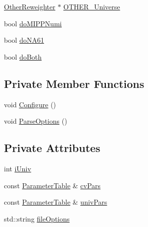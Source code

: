 \begin{DoxyCompactItemize}
\item 
\hyperlink{class_neutrino_flux_reweight_1_1_other_reweighter}{Other\-Reweighter} $\ast$ \hyperlink{class_neutrino_flux_reweight_1_1_reweight_driver_a2dc00c13f6d02ff7fb1fdce8f3a07413}{O\-T\-H\-E\-R\-\_\-\-Universe}
\item 
bool \hyperlink{class_neutrino_flux_reweight_1_1_reweight_driver_af4008e9db9a4dd5421e110e8281f5690}{do\-M\-I\-P\-P\-Numi}
\item 
bool \hyperlink{class_neutrino_flux_reweight_1_1_reweight_driver_a2bf534e3c1edd88075c4cf720390e2df}{do\-N\-A61}
\item 
bool \hyperlink{class_neutrino_flux_reweight_1_1_reweight_driver_ae950950ece1bdb68ce6bf20713f98209}{do\-Both}
\end{DoxyCompactItemize}
\subsection*{Private Member Functions}
\begin{DoxyCompactItemize}
\item 
void \hyperlink{class_neutrino_flux_reweight_1_1_reweight_driver_a7395fe76708db62b11ec9e867b48f30d}{Configure} ()
\item 
void \hyperlink{class_neutrino_flux_reweight_1_1_reweight_driver_adf5e4b16f98f623becd2907dde4ad12e}{Parse\-Options} ()
\end{DoxyCompactItemize}
\subsection*{Private Attributes}
\begin{DoxyCompactItemize}
\item 
int \hyperlink{class_neutrino_flux_reweight_1_1_reweight_driver_a916073e9a6658dd7cbc7c8819dd71c8a}{i\-Univ}
\item 
const \hyperlink{class_neutrino_flux_reweight_1_1_parameter_table}{Parameter\-Table} \& \hyperlink{class_neutrino_flux_reweight_1_1_reweight_driver_a93cb180e2036c14451c07e26efda51ea}{cv\-Pars}
\item 
const \hyperlink{class_neutrino_flux_reweight_1_1_parameter_table}{Parameter\-Table} \& \hyperlink{class_neutrino_flux_reweight_1_1_reweight_driver_aba84cdde8ffe230f4c4dc4ff954725a2}{univ\-Pars}
\item 
std\-::string \hyperlink{class_neutrino_flux_reweight_1_1_reweight_driver_a5c94865c09d7fd5441ef12c1ec7792f4}{file\-Options}
\end{DoxyCompactItemize}


